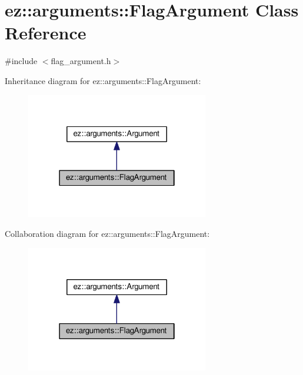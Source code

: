\hypertarget{classez_1_1arguments_1_1FlagArgument}{}\section{ez\+:\+:arguments\+:\+:Flag\+Argument Class Reference}
\label{classez_1_1arguments_1_1FlagArgument}


{\ttfamily \#include $<$flag\+\_\+argument.\+h$>$}



Inheritance diagram for ez\+:\+:arguments\+:\+:Flag\+Argument\+:
\nopagebreak
\begin{figure}[H]
\begin{center}
\leavevmode
\includegraphics[width=226pt]{classez_1_1arguments_1_1FlagArgument__inherit__graph}
\end{center}
\end{figure}


Collaboration diagram for ez\+:\+:arguments\+:\+:Flag\+Argument\+:
\nopagebreak
\begin{figure}[H]
\begin{center}
\leavevmode
\includegraphics[width=226pt]{classez_1_1arguments_1_1FlagArgument__coll__graph}
\end{center}
\end{figure}
